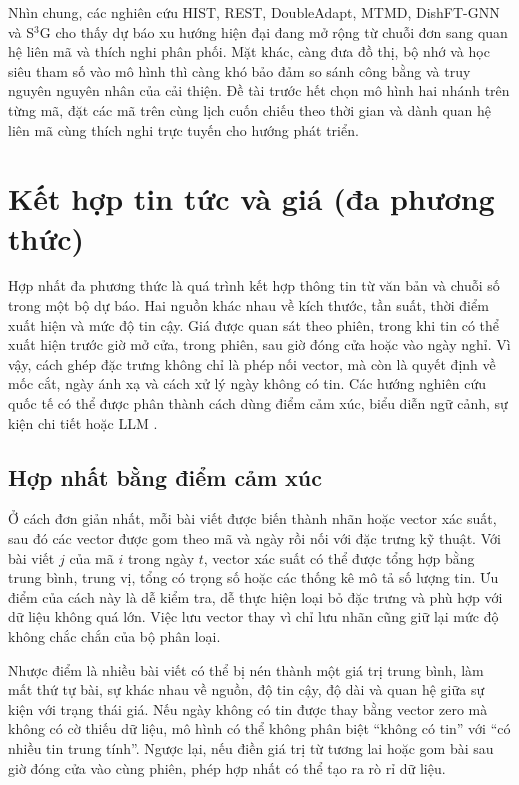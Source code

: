 Nhìn chung, các nghiên cứu HIST, REST, DoubleAdapt, MTMD, DishFT-GNN và S$^{3}$G cho
thấy dự báo xu hướng hiện đại đang mở rộng từ chuỗi đơn sang quan hệ liên mã và thích
nghi phân phối. Mặt khác, càng đưa đồ thị, bộ nhớ và học siêu tham số vào mô hình thì
càng khó bảo đảm so sánh công bằng và truy nguyên nguyên nhân của cải thiện. Đề tài
trước hết chọn mô hình hai nhánh trên từng mã, đặt các mã trên cùng lịch cuốn chiếu theo thời gian
và dành quan hệ liên mã cùng thích nghi trực tuyến cho hướng phát triển.

\section{Kết hợp tin tức và giá (đa phương thức)}
\label{sec:tq-fusion}

Hợp nhất đa phương thức là quá trình kết hợp thông tin từ văn bản và chuỗi số trong
một bộ dự báo. Hai nguồn khác nhau về kích thước, tần suất, thời điểm xuất hiện và
mức độ tin cậy. Giá được quan sát theo phiên, trong khi tin có thể xuất hiện trước giờ
mở cửa, trong phiên, sau giờ đóng cửa hoặc vào ngày nghỉ. Vì vậy, cách ghép đặc trưng
không chỉ là phép nối vector, mà còn là quyết định về mốc cắt, ngày ánh xạ và cách xử
lý ngày không có tin. Các hướng nghiên cứu quốc tế có thể được phân thành cách dùng
điểm cảm xúc, biểu diễn ngữ cảnh, sự kiện chi tiết hoặc LLM
\cite{Halder2022_221107392v1,Elahi2024_241101368v1}.

\subsection{Hợp nhất bằng điểm cảm xúc}

Ở cách đơn giản nhất, mỗi bài viết được biến thành nhãn hoặc vector xác suất, sau đó
các vector được gom theo mã và ngày rồi nối với đặc trưng kỹ thuật. Với bài viết $j$
của mã $i$ trong ngày $t$, vector xác suất có thể được tổng hợp bằng trung bình, trung
vị, tổng có trọng số hoặc các thống kê mô tả số lượng tin. Ưu điểm của cách này là
dễ kiểm tra, dễ thực hiện loại bỏ đặc trưng và phù hợp với dữ liệu không quá lớn. Việc lưu
vector thay vì chỉ lưu nhãn cũng giữ lại mức độ không chắc chắn của bộ phân loại.

Nhược điểm là nhiều bài viết có thể bị nén thành một giá trị trung bình, làm mất thứ tự bài,
sự khác nhau về nguồn, độ tin cậy, độ dài và quan hệ giữa sự kiện với trạng thái giá.
Nếu ngày không có tin được thay bằng vector zero mà không có cờ thiếu dữ liệu, mô hình
có thể không phân biệt ``không có tin'' với ``có nhiều tin trung tính''. Ngược lại, nếu
điền giá trị từ tương lai hoặc gom bài sau giờ đóng cửa vào cùng phiên, phép hợp nhất
có thể tạo ra rò rỉ dữ liệu.

